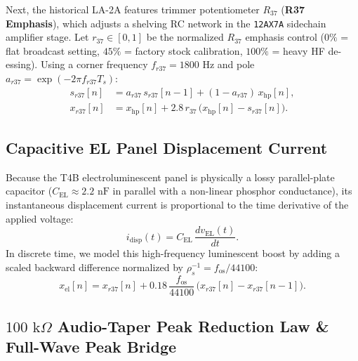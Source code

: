 \documentclass[11pt,a4paper]{article}
\begin{document}
Next, the historical LA-2A features trimmer potentiometer $R_{37}$ (\textbf{R37 Emphasis}), which adjusts a shelving RC network in the \texttt{12AX7A} sidechain amplifier stage. Let $r_{37} \in [0, 1]$ be the normalized $R_{37}$ emphasis control ($0\%$ = flat broadcast setting, $45\%$ = factory stock calibration, $100\%$ = heavy HF de-essing). Using a corner frequency $f_{r37} = 1800\text{ Hz}$ and pole $a_{r37} = \exp(-2\pi f_{r37} T_s)$:
\begin{align}
    s_{r37}[n] &= a_{r37}\,s_{r37}[n-1] + (1 - a_{r37})\,x_{\text{hp}}[n], \\
    x_{r37}[n] &= x_{\text{hp}}[n] + 2.8\,r_{37}\,\bigl(x_{\text{hp}}[n] - s_{r37}[n]\bigr).
\end{align}

\subsection{Capacitive EL Panel Displacement Current}

Because the T4B electroluminescent panel is physically a lossy parallel-plate capacitor ($C_{\text{EL}} \approx 2.2\text{ nF}$ in parallel with a non-linear phosphor conductance), its instantaneous displacement current is proportional to the time derivative of the applied voltage:
\begin{equation}
    i_{\text{disp}}(t) = C_{\text{EL}}\,\frac{dv_{\text{EL}}(t)}{dt}.
\end{equation}
In discrete time, we model this high-frequency luminescent boost by adding a scaled backward difference normalized by $\rho_s^{-1} = f_{\text{os}} / 44100$:
\begin{equation}
    x_{\text{el}}[n] = x_{r37}[n] + 0.18\,\frac{f_{\text{os}}}{44100}\,\bigl(x_{r37}[n] - x_{r37}[n-1]\bigr).
\end{equation}

\subsection{\texorpdfstring{$100\text{ k}\Omega$}{100 kOhm} Audio-Taper Peak Reduction Law \& Full-Wave Peak Bridge}
\end{document}
